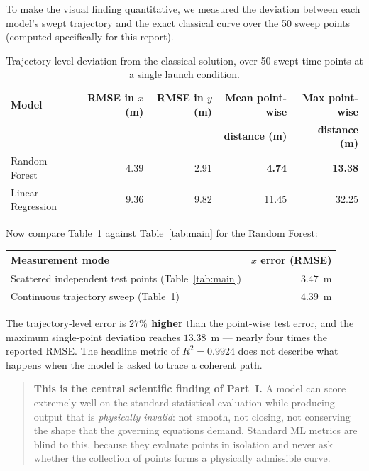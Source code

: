 \documentclass[11pt,a4paper]{article}
\newcommand{\Rsq}{R^{2}}
\begin{document}
To make the visual finding quantitative, we measured the deviation between each model's swept
trajectory and the exact classical curve over the 50 sweep points (computed specifically for this
report).

\begin{table}[h]
\centering
\caption{Trajectory-level deviation from the classical solution, over 50 swept time points at a
single launch condition.}
\label{tab:traj}
\begin{tabular}{@{}lrrrr@{}}
\toprule
\textbf{Model} & \textbf{RMSE in $x$ (m)} & \textbf{RMSE in $y$ (m)} &
\textbf{Mean point-wise} & \textbf{Max point-wise} \\
 & & & \textbf{distance (m)} & \textbf{distance (m)} \\
\midrule
Random Forest     & 4.39 & 2.91 & \textbf{4.74}  & \textbf{13.38} \\
Linear Regression & 9.36 & 9.82 & 11.45 & 32.25 \\
\bottomrule
\end{tabular}
\end{table}

Now compare Table~\ref{tab:traj} against Table~\ref{tab:main} for the Random Forest:

\begin{table}[h]
\centering
\small
\begin{tabular}{@{}lr@{}}
\toprule
\textbf{Measurement mode} & \textbf{$x$ error (RMSE)} \\
\midrule
Scattered independent test points (Table~\ref{tab:main}) & $3.47$~m \\
Continuous trajectory sweep (Table~\ref{tab:traj})       & $4.39$~m \\
\bottomrule
\end{tabular}
\end{table}

The trajectory-level error is \textbf{$27\%$ higher} than the point-wise test error, and the maximum
single-point deviation reaches $13.38$~m --- nearly four times the reported RMSE. The headline metric
of $\Rsq=0.9924$ does not describe what happens when the model is asked to trace a coherent path.

\begin{quote}
\textbf{This is the central scientific finding of Part~I.} A model can score extremely well on the
standard statistical evaluation while producing output that is \emph{physically invalid}: not
smooth, not closing, not conserving the shape that the governing equations demand. Standard ML
metrics are blind to this, because they evaluate points in isolation and never ask whether the
collection of points forms a physically admissible curve.
\end{quote}
\end{document}

